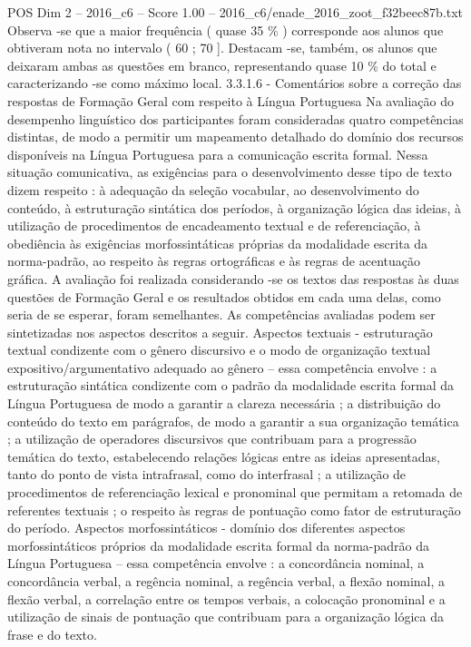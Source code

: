 \begin{textsample}{POS Dim 2 – 2016\_c6 – Score 1.00 – 2016\_c6/enade\_2016\_zoot\_f32beec87b.txt}
Observa -se que a maior frequência ( quase 35 \% ) corresponde aos alunos que obtiveram nota no intervalo ( 60 ; 70 ].
Destacam -se, também, os alunos que deixaram ambas as questões em branco, representando quase 10 \% do total e caracterizando -se como máximo local. 3.3.1.6 - Comentários sobre a correção das respostas de Formação Geral com respeito à Língua Portuguesa Na avaliação do desempenho linguístico dos participantes foram consideradas quatro competências distintas, de modo a permitir um mapeamento detalhado do domínio dos recursos disponíveis na Língua Portuguesa para a comunicação escrita formal.
Nessa situação comunicativa, as exigências para o desenvolvimento desse tipo de texto dizem respeito : à adequação da seleção vocabular, ao desenvolvimento do conteúdo, à estruturação sintática dos períodos, à organização lógica das ideias, à utilização de procedimentos de encadeamento textual e de referenciação, à obediência às exigências morfossintáticas próprias da modalidade escrita da norma-padrão, ao respeito às regras ortográficas e às regras de acentuação gráfica.
A avaliação foi realizada considerando -se os textos das respostas às duas questões de Formação Geral e os resultados obtidos em cada uma delas, como seria de se esperar, foram semelhantes.
As competências avaliadas podem ser sintetizadas nos aspectos descritos a seguir.
Aspectos textuais - estruturação textual condizente com o gênero discursivo e o modo de organização textual expositivo/argumentativo adequado ao gênero – essa competência envolve : a estruturação sintática condizente com o padrão da modalidade escrita formal da Língua Portuguesa de modo a garantir a clareza necessária ; a distribuição do conteúdo do texto em parágrafos, de modo a garantir a sua organização temática ; a utilização de operadores discursivos que contribuam para a progressão temática do texto, estabelecendo relações lógicas entre as ideias apresentadas, tanto do ponto de vista intrafrasal, como do interfrasal ; a utilização de procedimentos de referenciação lexical e pronominal que permitam a retomada de referentes textuais ; o respeito às regras de pontuação como fator de estruturação do período.
Aspectos morfossintáticos - domínio dos diferentes aspectos morfossintáticos próprios da modalidade escrita formal da norma-padrão da Língua Portuguesa – essa competência envolve : a concordância nominal, a concordância verbal, a regência nominal, a regência verbal, a flexão nominal, a flexão verbal, a correlação entre os tempos verbais, a colocação pronominal e a utilização de sinais de pontuação que contribuam para a organização lógica da frase e do texto.

\end{textsample}
